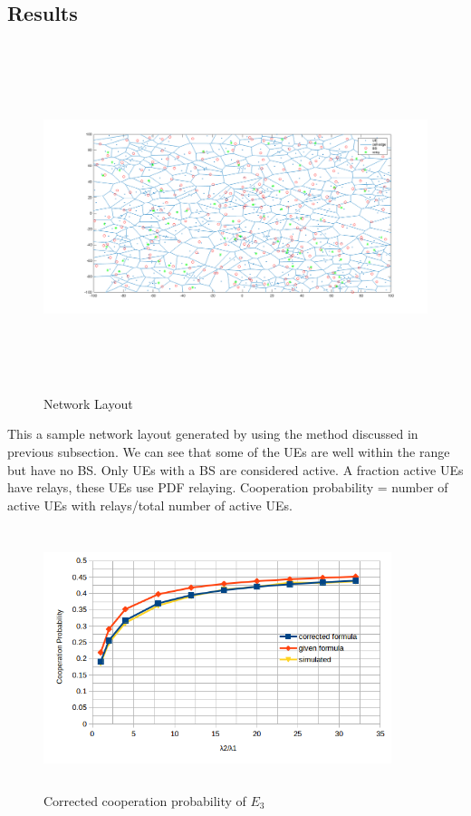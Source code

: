 \subsection{Results}
\begin{figure}[H]
\begin{center}
\includegraphics[height = 4in,width=7in,angle=00]{images/netLayoutSim.png}
\caption{\small Network Layout}
\label{fig:netLayoutSim}
\end{center}
\end{figure}
This a sample network layout generated by using the method discussed in previous subsection. We can see that some of the UEs are well within the range but have no BS. Only UEs with a BS are considered active. A fraction active UEs have relays, these UEs use PDF relaying. Cooperation probability = number of active UEs with relays/total number of active UEs.
\begin{figure}[H]
\begin{center}
\includegraphics[height = 3in,width=4in,angle=00]{images/corrected.png}
\caption{\small Corrected cooperation probability of $E_3$}
\label{fig:correctedE3}
\end{center}
\end{figure}

